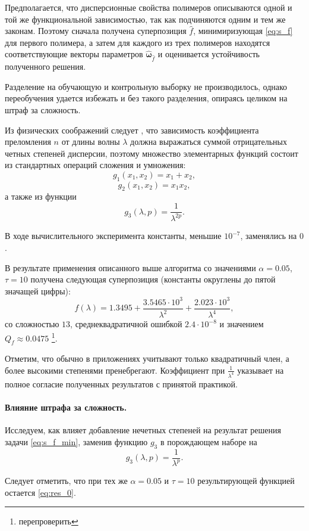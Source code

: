 \documentclass[12pt,a4paper]{article}
\theoremstyle{definition}
\begin{document}
Предполагается, что дисперсионные свойства полимеров описываются одной и той же функциональной зависимостью, так
как подчиняются одним и тем же законам. Поэтому сначала получена суперпозиция $\hat{f}$,
минимиризующая \eqref{eq:s_f} для первого полимера, а затем для каждого
из трех полимеров находятся соответствующие векторы параметров
$\hat{\boldsymbol{\omega}}_{\hat{f}}$ и оценивается устойчивость полученного решения.

Разделение на обучающую и контрольную выборку не производилось, однако переобучения
удается избежать и без такого разделения, опираясь целиком на штраф за сложность.

Из физических соображений следует \cite{Serova11}, что зависимость коэффициента
преломления $n$ от длины волны $\lambda$ должна выражаться суммой отрицательных
четных степеней дисперсии, поэтому множество элементарных функций состоит из
стандартных операций сложения и умножения:
\[
  g_1(x_1, x_2) = x_1 + x_2,
\]
\[
  g_2(x_1, x_2) = x_1 x_2,
\]
а также из функции
\[
  g_3(\lambda, p) = \frac{1}{\lambda^{2p}}.
\]

В ходе вычислительного эксперимента константы, меньшие $10^{-7}$,
заменялись на $0$.

В результате применения описанного выше алгоритма со значениями
$\alpha = 0.05$, $\tau = 10$ получена следующая суперпозиция
(константы округлены до пятой значащей цифры):
\begin{equation}
  f(\lambda) = 1.3495 + \frac{3.5465 \cdot 10^3}{\lambda^2} + \frac{2.023 \cdot 10^3}{\lambda^4},
  \label{eq:res_0}
\end{equation}
со сложностью $13$, среднеквадратичной ошибкой $2.4 \cdot 10^{-8}$ и значением $Q_f \approx 0.0475$ \footnote{перепроверить}.

Отметим, что обычно в приложениях учитывают только квадратичный член, а более
высокими степенями пренебрегают. Коэффициент при $\frac{1}{\lambda^4}$ указывает
на полное согласие полученных результатов с принятой практикой.

\paragraph{Влияние штрафа за сложность.}

Исследуем, как влияет добавление нечетных степеней на результат решения задачи \eqref{eq:s_f_min},
заменив функцию $g_3$ в порождающем наборе на
\[
  g_3(\lambda, p) = \frac{1}{\lambda^p}.
\]

Следует отметить, что при тех же $\alpha = 0.05$ и $\tau = 10$ результирующей функцией остается
\eqref{eq:res_0}.
\end{document}
